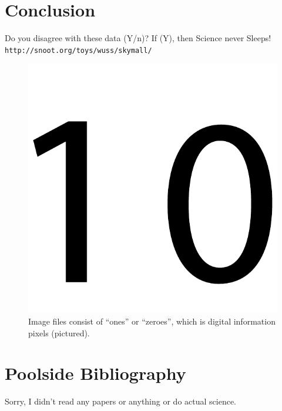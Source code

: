 \documentclass{article} %
\begin{document}
\section*{Conclusion}
Do you disagree with these data (Y/n)? If (Y), then Science never Sleeps!
{\tt http://snoot.org/toys/wuss/skymall/}

\begin{figure}
\begin{center}
\includegraphics[width=0.15 \linewidth]{ones}
\end{center}\vspace{-0.1in}
\caption{Image files consist of ``ones'' or ``zeroes'', which is
  digital information pixels (pictured).}
\label{fig:ones}
\end{figure}

\section*{Poolside Bibliography}
Sorry, I didn't read any papers or anything or do actual science.
\end{document}
